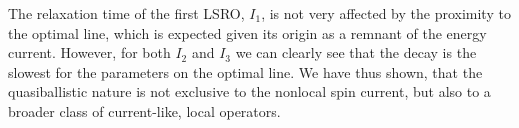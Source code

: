 The relaxation time of the first LSRO, \(I_1\), is not very affected by the proximity to the optimal line,
which is expected given its origin as a remnant of the energy current. However, for both
\(I_2\) and \(I_3\) we can clearly see that the decay is the slowest for the parameters on the optimal line.
We have thus shown, that the quasiballistic nature is not exclusive to the nonlocal spin current,
but also to a broader class of current-like, local operators.


